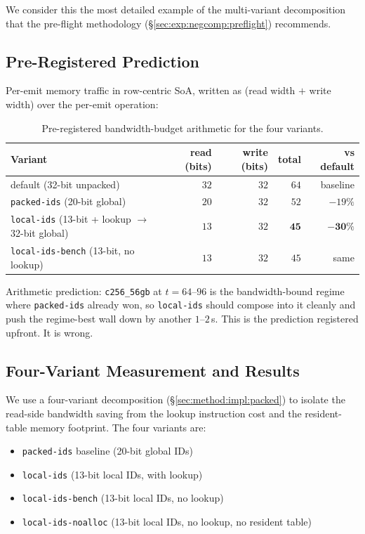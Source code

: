 We consider this the most detailed example of the multi-variant decomposition that the pre-flight methodology (§\ref{sec:exp:negcomp:preflight}) recommends.

\subsection{Pre-Registered Prediction}

Per-emit memory traffic in row-centric SoA, written as (read width $+$ write width) over the per-emit operation:

\begin{table}[H]
  \centering
  \caption[Pre-registered bandwidth-budget arithmetic.]{Pre-registered bandwidth-budget arithmetic for the four variants.}
  \label{tab:reindex_budget}
  \footnotesize
  \begin{tabular}{lrrrr}
    \toprule
    Variant & read (bits) & write (bits) & total & vs default \\
    \midrule
    default (32-bit unpacked) & $32$ & $32$ & $64$ & baseline \\
    \texttt{packed-ids} (20-bit global) & $20$ & $32$ & $52$ & $-19\%$ \\
    \texttt{local-ids} (13-bit + lookup $\rightarrow$ 32-bit global) & $13$ & $32$ & $\mathbf{45}$ & $\mathbf{-30\%}$ \\
    \texttt{local-ids-bench} (13-bit, no lookup) & $13$ & $32$ & $45$ & same \\
    \bottomrule
  \end{tabular}
\end{table}

Arithmetic prediction: \texttt{c256\_56gb} at $t=64$--$96$ is the bandwidth-bound regime where \texttt{packed-ids} already won, so \texttt{local-ids} should compose into it cleanly and push the regime-best wall down by another $1$--$2$\,s. This is the prediction registered upfront. It is wrong.

\subsection{Four-Variant Measurement and Results\label{sec:exp:reindex:variants}}

We use a four-variant decomposition (§\ref{sec:method:impl:packed}) to isolate the read-side bandwidth saving from the lookup instruction cost and the resident-table memory footprint. The four variants are:

\begin{itemize}
  \item \texttt{packed-ids} baseline (20-bit global IDs)
  \item \texttt{local-ids} (13-bit local IDs, with lookup)
  \item \texttt{local-ids-bench} (13-bit local IDs, no lookup)
  \item \texttt{local-ids-noalloc} (13-bit local IDs, no lookup, no resident table)
\end{itemize}

